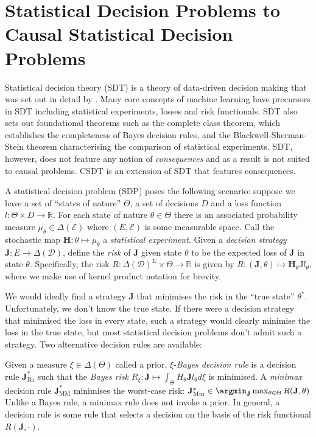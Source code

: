 
\section{Statistical Decision Problems to Causal Statistical Decision Problems}

Statistical decision theory (SDT) is a theory of data-driven decision making that was set out in detail by \citet{wald_statistical_1950}. Many core concepts of machine learning have precursors in SDT including statistical experiments, losses and risk functionals. SDT also sets out foundational theorems such as the complete class theorem, which establishes the completeness of Bayes decision rules, and the Blackwell-Sherman-Stein theorem characterising the comparison of statistical experiments. SDT, however, does not feature any notion of \emph{consequences} and as a result is not suited to causal problems. CSDT is an extension of SDT that features consequences.

A statistical decision problem (SDP) poses the following scenario: suppose we have a set of ``states of nature'' $\Theta$, a set of decisions $D$ and a loss function $l:\Theta\times D\to \mathbb{R}$. For each state of nature $\theta\in \Theta$ there is an associated probability measure $\mu_\theta\in \Delta(\mathcal{E})$ where $(E,\mathcal{E})$ is some measurable space. Call the stochastic map $\mathbf{H}:\theta\mapsto \mu_\theta$ a \emph{statistical experiment}. Given a \emph{decision strategy} $\mathbf{J}:E\to \Delta(\mathcal{D})$, define the \emph{risk} of $\mathbf{J}$ given state $\theta$ to be the expected loss of $\mathbf{J}$ in state $\theta$. Specifically, the risk $R:\Delta(\mathcal{D})^E\times \Theta\to \mathbb{R}$ is given by $R:(\mathbf{J},\theta)\mapsto \mathbf{H}_\theta \mathrm{J} l_\theta$, where we make use of kernel product notation for brevity.

We would ideally find a strategy $\mathbf{J}$ that minimises the risk in the ``true state'' $\theta^*$. Unfortunately, we don't know the true state. If there were a decision strategy that minimised the loss in every state, such a strategy would clearly minimise the loss in the true state, but most statistical decision problems don't admit such a strategy.  Two alternative decision rules are available:

Given a measure $\xi\in \Delta(\Theta)$ called a prior, $\xi$-\emph{Bayes decision rule} is a decision rule $\mathbf{J}^*_{\mathrm{Ba}}$ such that the \emph{Bayes risk} $R_\xi:\mathbf{J}\mapsto \int_\Theta H_\theta \mathbf{J} l_\theta d\xi$ is minimised. A \emph{minimax} decision rule $\mathbf{J}^*_{\mathrm{MM}}$ minimises the worst-case risk: $\mathbf{J}^*_{\mathrm{Mm}}\in \argmin_{\mathbf{J}} \max_{\theta\in \Theta} R(\mathbf{J},\theta)$ Unlike a Bayes rule, a minimax rule does not invoke a prior. In general, a decision rule is some rule that selects a decision on the basis of the risk functional $R(\mathbf{J},\cdot)$.


